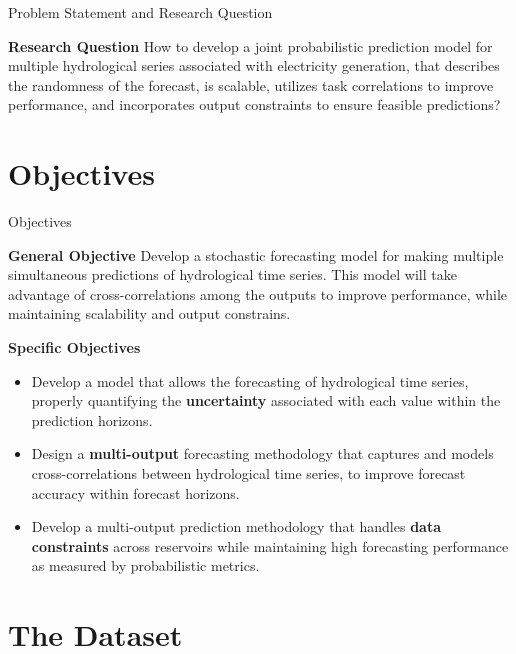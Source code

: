 \begin{frame}{Problem Statement and Research Question}
	
	
	
	\begin{block}{\textbf{Research Question}}
		How to develop a joint probabilistic prediction model for multiple hydrological series associated with electricity generation, that describes the randomness of the forecast, is scalable, utilizes task correlations to improve performance, and incorporates output constraints to ensure feasible predictions?
	\end{block}
\end{frame}


\section*{Objectives}

\begin{frame}{Objectives}
	\begin{block}{\textbf{General Objective}}
			Develop a stochastic forecasting model for making multiple simultaneous predictions of hydrological time series. This model will take advantage of cross-correlations among the outputs to improve performance, while maintaining scalability  and output constrains.
	\end{block}
	
	\begin{block}{\textbf{Specific Objectives}}
			
			\begin{itemize}
			\item Develop a model that allows the forecasting of hydrological time series, properly quantifying the \textcolor{myNewColorB}{\textbf{uncertainty}} associated with each value within the prediction horizons.
			\item  Design a \textcolor{myNewColorB}{\textbf{multi-output}} forecasting methodology that captures and models cross-correlations between hydrological time series, to improve forecast accuracy within forecast horizons.
			\item Develop a multi-output prediction methodology that handles \textcolor{myNewColorB}{\textbf{data constraints}} across reservoirs while maintaining high forecasting performance as measured by probabilistic metrics.
		\end{itemize}
	\end{block}
\end{frame}

\section*{The Dataset}

